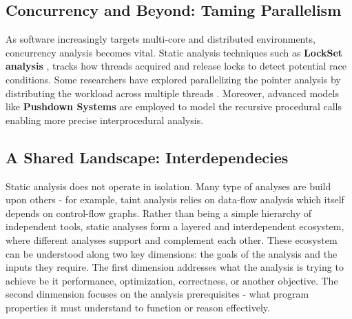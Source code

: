 \subsection{Concurrency and Beyond: Taming Parallelism}
As software increasingly targets multi-core and distributed environments, concurrency analysis becomes vital. 
Static analysis techniques such as \textbf{LockSet analysis} \cite{engler2003racerx}, tracks how threads acquired and release locks to detect potential race conditions.
Some researchers have explored parallelizing the pointer analysis by distributing the workload across multiple threads \cite{liu2019rethinking,su2014parallel}.
Moreover, advanced models like \textbf{Pushdown Systems} \cite{spath2019context} are employed to model the recursive procedural calls enabling more precise interprocedural analysis.


\subsection{A Shared Landscape: Interdependecies}
Static analysis does not operate in isolation. Many type of analyses are build upon others - for example, taint analysis relies on data-flow analysis which itself depends on control-flow graphs.
Rather than being a simple hierarchy of independent tools, static analyses form a layered and interdependent ecosystem, where different analyses support and complement each other.
These ecosystem can be understood along two key dimensions: the goals of the analysis and the inputs they require. 
The first dimension addresses what the analysis is trying to achieve be it performance, optimization, correctness, or another objective.
The second dinmension focuses on the analysis prerequisites - what program properties it must understand to function or reason effectively.